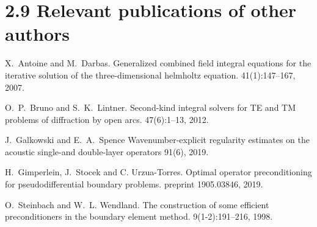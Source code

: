 \documentclass[]{article}
\begin{document}
\section*{2.9 Relevant publications of other authors}


\begin{thebibliography}{0}
	X.~Antoine and M.~Darbas.
	\newblock Generalized combined field integral equations for the iterative
	solution of the three-dimensional helmholtz equation.
	41(1):147--167, 2007.
	
	O.~P.~Bruno and S.~K.~Lintner.
	\newblock Second-kind integral solvers for TE and TM problems of diffraction by open arcs.
	 47(6):1--13, 2012.
	
	J.~Galkowski and E.~A.~Spence
	\newblock Wavenumber-explicit regularity estimates on the acoustic single-and double-layer operators
	91(6), 2019.
	
	H.~Gimperlein, J.~Stocek and C. Urzua-Torres.
	\newblock Optimal operator preconditioning for pseudodifferential boundary problems.
	 preprint 1905.03846, 2019.
	
	O.~Steinbach and W.~L. Wendland.
	\newblock The construction of some efficient preconditioners in the boundary
	element method.
	 9(1-2):191--216, 1998.
	
	
\end{thebibliography}
\end{document}
